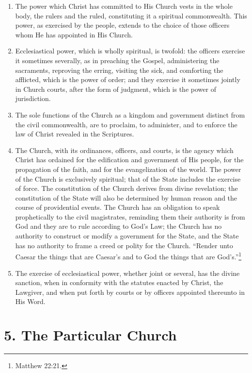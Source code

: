 \documentclass[
]{book}
\providecommand{\tightlist}{%
  \setlength{\itemsep}{0pt}\setlength{\parskip}{0pt}}
\begin{document}
\begin{enumerate}
\def\labelenumi{\arabic{enumi}.}
\tightlist
\item
  \protect\hypertarget{4}{\href{}{}}The power which Christ has committed to His Church vests in the whole body, the rulers and the ruled, constituting it a spiritual commonwealth. This power, as exercised by the people, extends to the choice of those officers whom He has appointed in His Church.
\item
  Ecclesiastical power, which is wholly spiritual, is twofold: the officers exercise it sometimes severally, as in preaching the Gospel, administering the sacraments, reproving the erring, visiting the sick, and comforting the afflicted, which is the power of order; and they exercise it sometimes jointly in Church courts, after the form of judgment, which is the power of jurisdiction.
\item
  The sole functions of the Church as a kingdom and government distinct from the civil commonwealth, are to proclaim, to administer, and to enforce the law of Christ revealed in the Scriptures.
\item
  The Church, with its ordinances, officers, and courts, is the agency which Christ has ordained for the edification and government of His people, for the propagation of the faith, and for the evangelization of the world. The power of the Church is exclusively spiritual; that of the State includes the exercise of force. The constitution of the Church derives from divine revelation; the constitution of the State will also be determined by human reason and the course of providential events. The Church has an obligation to speak prophetically to the civil magistrates, reminding them their authority is from God and they are to rule according to God's Law; the Church has no authority to construct or modify a government for the State, and the State has no authority to frame a creed or polity for the Church. ``Render unto Caesar the things that are Caesar's and to God the things that are God's.''\footnote{Matthew 22:21.}
\item
  The exercise of ecclesiastical power, whether joint or several, has the divine sanction, when in conformity with the statutes enacted by Christ, the Lawgiver, and when put forth by courts or by officers appointed thereunto in His Word.
\end{enumerate}

\hypertarget{the-particular-church}{%
\section*{5. The Particular Church}\label{the-particular-church}}
\end{document}
